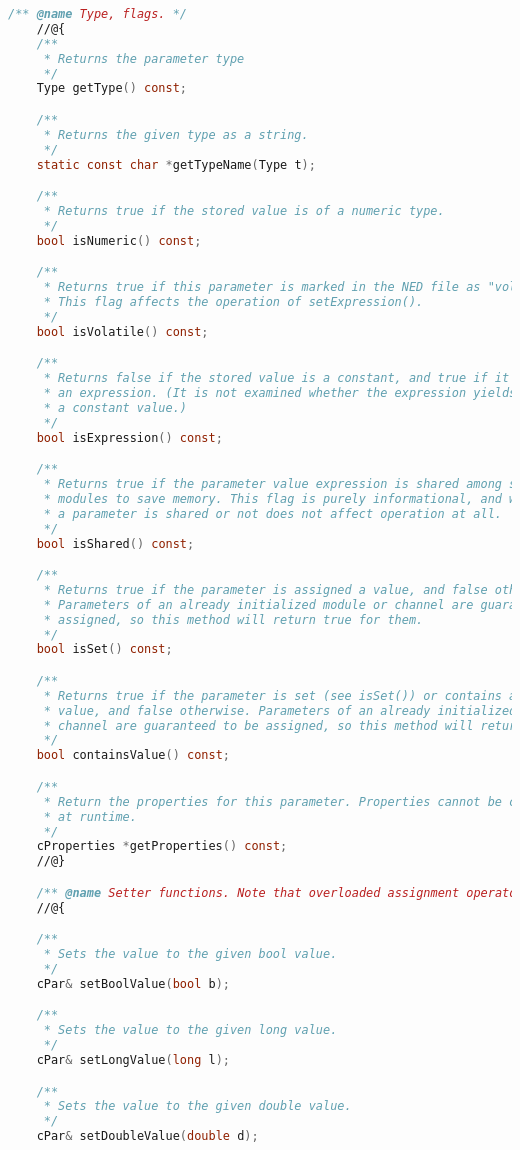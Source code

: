 \begin{lstlisting}[language=c]
    /** @name Type, flags. */
    //@{
    /**
     * Returns the parameter type
     */
    Type getType() const;

    /**
     * Returns the given type as a string.
     */
    static const char *getTypeName(Type t);

    /**
     * Returns true if the stored value is of a numeric type.
     */
    bool isNumeric() const;

    /**
     * Returns true if this parameter is marked in the NED file as "volatile".
     * This flag affects the operation of setExpression().
     */
    bool isVolatile() const;

    /**
     * Returns false if the stored value is a constant, and true if it is
     * an expression. (It is not examined whether the expression yields
     * a constant value.)
     */
    bool isExpression() const;

    /**
     * Returns true if the parameter value expression is shared among several
     * modules to save memory. This flag is purely informational, and whether
     * a parameter is shared or not does not affect operation at all.
     */
    bool isShared() const;

    /**
     * Returns true if the parameter is assigned a value, and false otherwise.
     * Parameters of an already initialized module or channel are guaranteed to
     * assigned, so this method will return true for them.
     */
    bool isSet() const;

    /**
     * Returns true if the parameter is set (see isSet()) or contains a default
     * value, and false otherwise. Parameters of an already initialized module or
     * channel are guaranteed to be assigned, so this method will return true for them.
     */
    bool containsValue() const;

    /**
     * Return the properties for this parameter. Properties cannot be changed
     * at runtime.
     */
    cProperties *getProperties() const;
    //@}

    /** @name Setter functions. Note that overloaded assignment operators also exist. */
    //@{

    /**
     * Sets the value to the given bool value.
     */
    cPar& setBoolValue(bool b);

    /**
     * Sets the value to the given long value.
     */
    cPar& setLongValue(long l);

    /**
     * Sets the value to the given double value.
     */
    cPar& setDoubleValue(double d);


\end{lstlisting}
